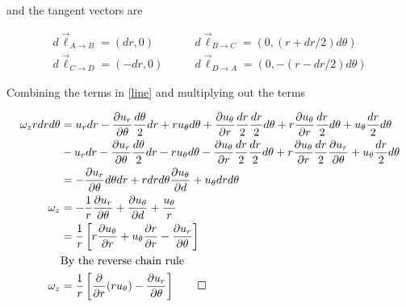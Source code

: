 \documentclass[11pt,twoside]{article}
\newcommand{\p}[2]{\frac{\partial#1}{\partial#2}}
\newcommand{\vect}[1]{\vec{#1}}
\begin{document}
\begin{enumerate}
\begin{enumerate}
and the tangent vectors are

\begin{align*}
d\vect{\ell}_{A\rightarrow B} = (dr, 0)\quad&\quad d\vect{\ell}_{B\rightarrow C} = (0, (r+dr/2)d\theta)\\
d\vect{\ell}_{C\rightarrow D} = (-dr,0) \quad&\quad d\vect{\ell}_{D\rightarrow A} = (0,-(r-dr/2)d\theta)
\end{align*}

Combining the terms in \autoref{line} and multiplying out the terms 

\begin{align*}
\omega_zrdrd\theta &= 
u_rdr-\p{u_r}{\theta}\frac{d\theta}{2}dr+
ru_\theta d\theta+
\p{u_\theta}{r}\frac{dr}{2}\frac{dr}{2}d\theta+
r\p{u_\theta}{r}\frac{dr}{2}d\theta+
u_\theta\frac{dr}{2}d\theta \\
& - u_rdr
-\p{u_r}{\theta}\frac{d\theta}{2}dr
-ru_\theta d\theta
-\p{u_\theta}{r}\frac{dr}{2}\frac{dr}{2} d\theta
+ r\p{u_\theta}{r}\frac{dr}{2}\p{u_r}{\theta}
+u_\theta\frac{dr}{2}d\theta \\
&= -\p{u_r}{\theta}d\theta dr + rdrd\theta\p{u_\theta}{d} + u_\theta drd\theta\\
\omega_z & = -\frac{1}{r}\p{u_r}{\theta} + \p{u_\theta}{d} + \frac{u_\theta}{r}\\
         & = \frac{1}{r}\left[ r\p{u_\theta}{r} + u_\theta\p{r}{r} - \p{u_r}{\theta}\right]\\
         & \mbox{By the reverse chain rule}\\
\omega_z & = \frac{1}{r}\left[ \p{}{r}(r u_\theta) - \p{u_r}{\theta}\right]\qed
\end{align*}

\end{enumerate}



\end{enumerate}
\end{document}
